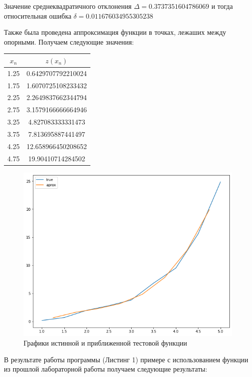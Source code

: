 \documentclass [12pt]{article}
\begin{document}
Значение среднеквадратичного отклонения $\Delta = 0.3737351604786069$ и тогда относительная ошибка $\delta = 0.011676034955305238$

Также была проведена аппроксимация функции в точках, лежаших между опорными. Получаем следующие значения:

\begin{center}
\begin{tabular}{|c|c|}
    \hline
    $x_n$ & $z(x_n)$ \\ \hline
    1.25 & 0.6429707792210024 \\ \hline
    1.75 & 1.6070725108233432 \\ \hline
    2.25 & 2.2649837662344794 \\ \hline
    2.75 & 3.1579166666664946 \\ \hline
    3.25 & 4.827083333331473 \\ \hline
    3.75 & 7.813695887441497 \\ \hline
    4.25 & 12.658966450208652 \\ \hline
    4.75 & 19.90410714284502 \\ \hline
\end{tabular}
\end{center}

\begin{figure}[H]
    \includegraphics[width=\linewidth]{test_func.png}
    \caption{Графики истинной и приближенной тестовой функции}
    \label{fig:graph1}
\end{figure}

В результате работы программы (Листинг 1) примере с использованием функции из прошлой лабораторной работы получаем следующие результаты: 
\end{document}
